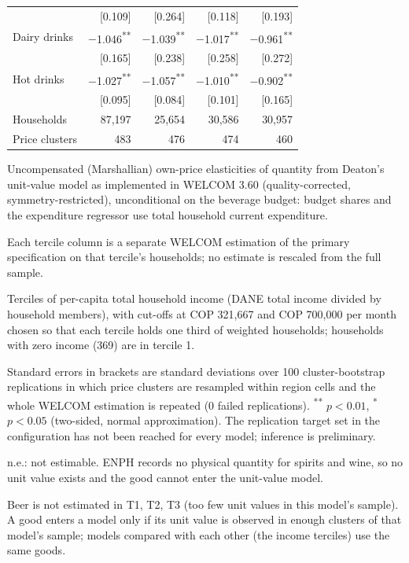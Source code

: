 \documentclass[
  11pt,
]{article}
\begin{document}
\begin{table}[!htbp]
\begin{threeparttable}
\begin{tabular}{lrrrr}
 & [0.109] & [0.264] & [0.118] & [0.193] \\
Dairy drinks & $-$1.046\textsuperscript{**} & $-$1.039\textsuperscript{**} & $-$1.017\textsuperscript{**} & $-$0.961\textsuperscript{**} \\
 & [0.165] & [0.238] & [0.258] & [0.272] \\
Hot drinks & $-$1.027\textsuperscript{**} & $-$1.057\textsuperscript{**} & $-$1.010\textsuperscript{**} & $-$0.902\textsuperscript{**} \\
 & [0.095] & [0.084] & [0.101] & [0.165] \\
\addlinespace
Households & 87,197 & 25,654 & 30,586 & 30,957 \\
Price clusters & 483 & 476 & 474 & 460 \\
\bottomrule
\end{tabular}
\begin{tablenotes}[flushleft]
\footnotesize
\item Uncompensated (Marshallian) own-price elasticities of quantity from Deaton's unit-value model as implemented in WELCOM 3.60 (quality-corrected, symmetry-restricted), unconditional on the beverage budget: budget shares and the expenditure regressor use total household current expenditure.
\item Each tercile column is a separate WELCOM estimation of the primary specification on that tercile's households; no estimate is rescaled from the full sample.
\item Terciles of per-capita total household income (DANE total income divided by household members), with cut-offs at COP 321,667 and COP 700,000 per month chosen so that each tercile holds one third of weighted households; households with zero income (369) are in tercile 1.
\item Standard errors in brackets are standard deviations over 100 cluster-bootstrap replications in which price clusters are resampled within region cells and the whole WELCOM estimation is repeated (0 failed replications). \textsuperscript{**} $p<0.01$, \textsuperscript{*} $p<0.05$ (two-sided, normal approximation). The replication target set in the configuration has not been reached for every model; inference is preliminary.
\item n.e.: not estimable. ENPH records no physical quantity for spirits and wine, so no unit value exists and the good cannot enter the unit-value model.
\item Beer is not estimated in T1, T2, T3 (too few unit values in this model's sample). A good enters a model only if its unit value is observed in enough clusters of that model's sample; models compared with each other (the income terciles) use the same goods.
\end{tablenotes}
\end{threeparttable}
\end{table}
\end{document}
